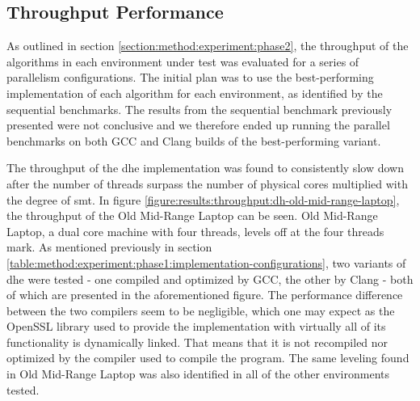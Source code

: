 
\subsection{Throughput Performance}

As outlined in section \ref{section:method:experiment:phase2}, the throughput of the algorithms in each environment under test was evaluated for a series of parallelism configurations. The initial plan was to use the best-performing implementation of each algorithm for each environment, as identified by the sequential benchmarks. The results from the sequential benchmark previously presented were not conclusive and we therefore ended up running the parallel benchmarks on both GCC and Clang builds of the best-performing variant.

The throughput of the \gls{dhe} implementation was found to consistently slow down after the number of threads surpass the number of physical cores multiplied with the degree of \gls{smt}. In figure \ref{figure:results:throughput:dh-old-mid-range-laptop}, the throughput of the Old Mid-Range Laptop can be seen. Old Mid-Range Laptop, a dual core machine with four threads, levels off at the four threads mark. As mentioned previously in section \ref{table:method:experiment:phase1:implementation-configurations}, two variants of \gls{dhe} were tested - one compiled and optimized by GCC, the other by Clang - both of which are presented in the aforementioned figure. The performance difference between the two compilers seem to be negligible, which one may expect as the OpenSSL library used to provide the implementation with virtually all of its functionality is dynamically linked. That means that it is not recompiled nor optimized by the compiler used to compile the program. The same leveling found in Old Mid-Range Laptop was also identified in all of the other environments tested.

